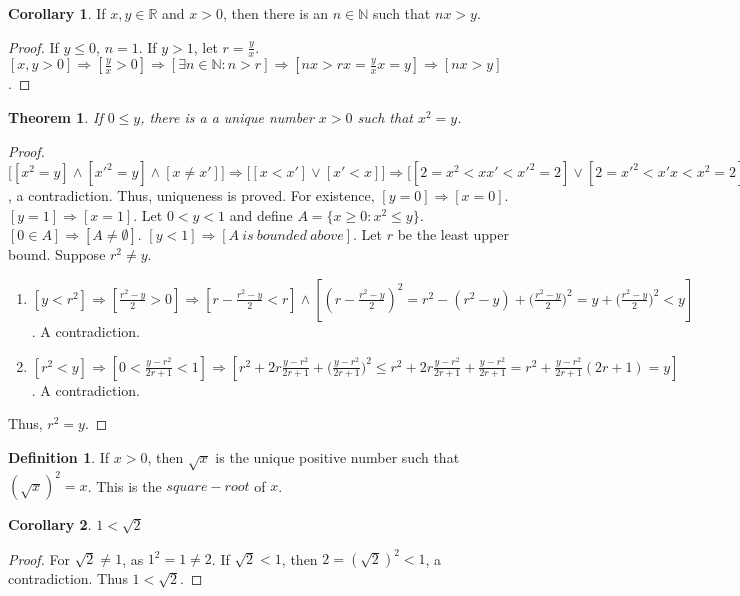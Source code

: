 \documentclass[oneside]{book}
\newtheorem{theorem}{Theorem}[section]
\theoremstyle{definition}
\newtheorem{definition}{Definition}[section]
\newtheorem{corollary}{Corollary}[section]
\begin{document}
\begin{corollary}
If $x,y\in \mathbb{R}$ and $x>0$, then there is an $n\in \mathbb{N}$ such that $nx>y$.
\end{corollary}
\begin{proof}
If $y\leq 0$, $n=1$. If $y>1$, let $r = \frac{y}{x}$. $[x,y>0]\Rightarrow [\frac{y}{x}>0]\Rightarrow [\exists n\in \mathbb{N}:n>r]\Rightarrow [nx > rx = \frac{y}{x}x = y]\Rightarrow[nx>y]$.
\end{proof}

\begin{theorem}
If $0\leq y$, there is a a unique number $x>0$ such that $x^2 = y$.
\end{theorem}
\begin{proof}
$\big[[x^2=y]\land [x'^2=y]\land [x\ne x']\big] \Rightarrow \big[[x<x']\lor[x'<x]\big] \Rightarrow \big[[2=x^2<xx'<x'^2=2]\lor[2=x'^2<x'x<x^2=2]\big]$, a contradiction. Thus, uniqueness is proved. For existence, $[y=0]\Rightarrow[x=0]$.$[y=1]\Rightarrow [x=1]$. Let $0 < y < 1$ and define $A = \{x\geq0:x^2 \leq y\}$. $[0\in A]\Rightarrow[A\ne \emptyset]$. $[y<1]\Rightarrow [A\ is\ bounded\ above]$. Let $r$ be the least upper bound. Suppose $r^2\ne y$.
\begin{enumerate}
\item $[y<r^2]\Rightarrow[\frac{r^2-y}{2}>0]\Rightarrow [r-\frac{r^2-y}{2}<r]\land[(r-\frac{r^2-y}{2})^2= r^2 - (r^2-y)+\big(\frac{r^2-y}{2}\big)^2 = y + \big(\frac{r^2-y}{2}\big)^2 < y]$. A contradiction.
\item $[r^2 <y]\Rightarrow [0<\frac{y-r^2}{2r+1}<1]\Rightarrow [r^2 + 2r\frac{y-r^2}{2r+1}+\big(\frac{y-r^2}{2r+1}\big)^2\leq r^2 + 2r\frac{y-r^2}{2r+1}+\frac{y-r^2}{2r+1} = r^2+\frac{y-r^2}{2r+1}(2r+1)=y]$. A contradiction.
\end{enumerate}
Thus, $r^2 = y$.
\end{proof}

\begin{definition}
If $x>0$, then $\sqrt{x}$ is the unique positive number such that $(\sqrt{x})^2 = x$. This is the $square-root$ of $x$.
\end{definition}

\begin{corollary}
$1<\sqrt{2}$
\end{corollary}
\begin{proof}
For $\sqrt{2} \ne 1$, as $1^2 = 1\ne 2$. If $\sqrt{2}<1$, then $2=(\sqrt{2})^2 <1$, a contradiction. Thus $1<\sqrt{2}$.
\end{proof}
\end{document}
